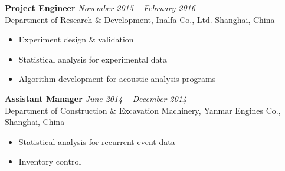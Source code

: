\documentclass[letterpaper, 10pt]{article}
\newenvironment{changemargin}[2]{%
  \begin{list}{}{%
      \setlength{\topsep}{0pt}%
      \setlength{\leftmargin}{#1}%
      \setlength{\rightmargin}{#2}%
      \setlength{\listparindent}{\parindent}%
      \setlength{\itemindent}{\parindent}%
      \setlength{\parsep}{\parskip}%
    }%
  \item[]}{\end{list}
}
\newenvironment{body} {
  \vspace*{-16pt}
  \begin{changemargin}{-0.25in}{-0.5in}
  }
  {\end{changemargin}
}
\begin{document}
\begin{body}
	\vspace{14pt}
	
	\textbf{Project Engineer}\hfill
	\emph{November 2015 -- February 2016} \\
	Department of Research \& Development, Inalfa Co., Ltd.  \hfill Shanghai, China
	\vspace{-2pt}
	\begin{itemize}
		\setlength{\itemindent}{0in}
		\setlength{\itemsep}{0in}
		\item Experiment design \& validation
		\item Statistical analysis for experimental data
		\item Algorithm development for acoustic analysis programs
	\end{itemize}
	
	
	\textbf{Assistant Manager}\hfill
	\emph{June 2014 -- December 2014} \\
	Department of Construction \& Excavation Machinery, Yanmar Engines Co.,  \hfill Shanghai, China
	\vspace{-2pt}
	\begin{itemize}
		\setlength{\itemindent}{0in}
		\setlength{\itemsep}{0in}
		\item Statistical analysis for recurrent event data
		\item Inventory control
	\end{itemize}
	
	
\end{body}
\smallskip
\end{document}

